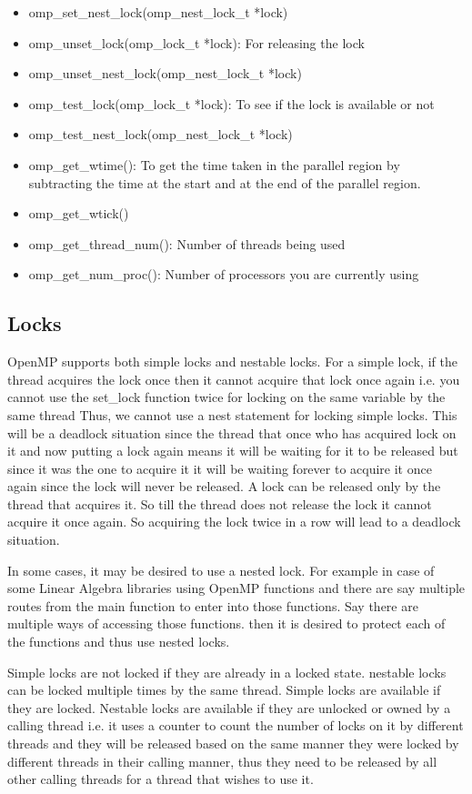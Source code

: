 \documentclass[12pt]{book}
\begin{document}
\begin{itemize}
    \item omp\_set\_nest\_lock(omp\_nest\_lock\_t *lock)
    \item omp\_unset\_lock(omp\_lock\_t *lock): For releasing the lock
    \item omp\_unset\_nest\_lock(omp\_nest\_lock\_t *lock)
    \item omp\_test\_lock(omp\_lock\_t *lock): To see if the lock is available or not
    \item omp\_test\_nest\_lock(omp\_nest\_lock\_t *lock)
    \item omp\_get\_wtime(): To get the time taken in the parallel region by subtracting the time at the start and at the end of the parallel region.
    \item omp\_get\_wtick()
    \item omp\_get\_thread\_num(): Number of threads being used
    \item omp\_get\_num\_proc(): Number of processors you are currently using
\end{itemize}

\subsection{Locks}
OpenMP supports both simple locks and nestable locks. For a simple lock, if the thread acquires the lock once then it cannot acquire that lock once again i.e. you cannot use the set\_lock function twice for locking on the same variable by the same thread Thus, we cannot use a nest statement for locking simple locks. This will be a deadlock situation since the thread that once who has acquired lock on it and now putting a lock again means it will be waiting for it to be released but since it was the one to acquire it it will be waiting forever to acquire it once again since the lock will never be released. A lock can be released only by the thread that acquires it. So till the thread does not release the lock it cannot acquire it once again. So acquiring the lock twice in a row will lead to a deadlock situation.

In some cases, it may be desired to use a nested lock. For example in case of some Linear Algebra libraries using OpenMP functions and there are say multiple routes from the main function to enter into those functions. Say there are multiple ways of accessing those functions. then it is desired to protect each of the functions and thus use nested locks.

Simple locks are not locked if they are already in a locked state. nestable locks can be locked multiple times by the same thread. Simple locks are available if they are locked. Nestable locks are available if they are unlocked or owned by a calling thread i.e. it uses a counter to count the number of locks on it by different threads and they will be released based on the same manner they were locked by different threads in their calling manner, thus they need to be released by all other calling threads for a thread that wishes to use it.
\end{document}
